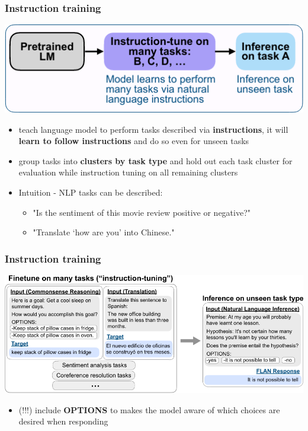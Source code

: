 \documentclass{beamer}
\begin{document}
\begin{frame}
    \frametitle{Instruction training}
    \begin{center}
        \includegraphics[scale=1.4]{img/zero_shot_method2.png}
    \end{center}
    \begin{itemize}
        \item \footnotesize{teach language model to perform tasks described via \textbf{instructions}, it will \textbf{learn to follow instructions} and do so even for unseen tasks}
        \item \footnotesize{group tasks into \textbf{clusters by task type} and hold out each task cluster for evaluation while instruction tuning on all remaining clusters}
        \item Intuition - \footnotesize{NLP tasks can be described:}
        \begin{itemize}
            \item \footnotesize{"Is the sentiment of this movie review positive or negative?"}
            \item \footnotesize{"Translate ‘how are you’ into Chinese."}
        \end{itemize}          
    \end{itemize}
\end{frame}

\begin{frame}
    \frametitle{Instruction training}
    \begin{center}
        \includegraphics[scale=1.4]{img/instruction_tuning.png}
    \end{center}
    \begin{itemize}
        \item \footnotesize{(!!!) include \textbf{OPTIONS} to makes the model aware of which choices are desired when responding}
    \end{itemize}
\end{frame}
\end{document}
